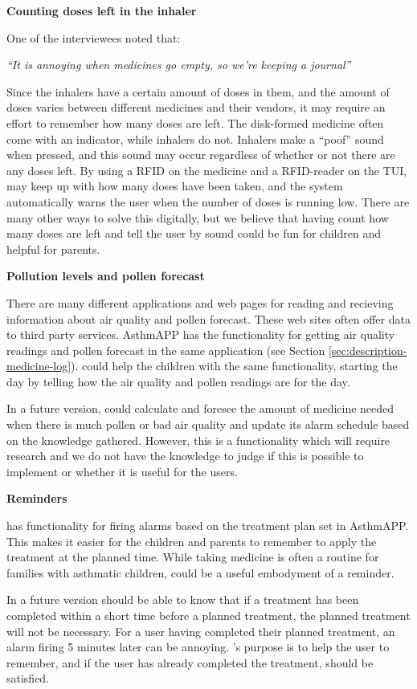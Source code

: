 \textbf{Counting doses left in the inhaler}

One of the interviewees noted that: 

\textit{``It is annoying when medicines go empty, so we're keeping a journal''}

Since the inhalers have a certain amount of doses in them, and the amount of doses varies between different medicines and their vendors, it may require an effort to remember how many doses are left. The disk-formed medicine often come with an indicator, while inhalers do not. Inhalers make a ``poof'' sound when pressed, and this sound may occur regardless of whether or not there are any doses left. By using a RFID on the medicine and a RFID-reader on the TUI, may keep up with how many doses have been taken, and the system automatically warns the user when the number of doses is running low. There are many other ways to solve this digitally, but we believe that having \buddy{} count how many doses are left and  tell the user by sound could be fun for children and helpful for parents.


\textbf{Pollution levels and pollen forecast}

There are many different applications and web pages for reading and recieving information about air quality and pollen forecast. These web sites often offer data to third party services. AsthmAPP has the functionality for getting air quality readings and pollen forecast in the same application (see Section \ref{sec:description-medicine-log}).
\buddy{} could help the children with the same functionality, starting the day by telling how the air quality and pollen readings are for the day. 

In a future version, \buddy{} could calculate and foresee the amount of medicine needed when there is much pollen or bad air quality and update its alarm schedule based on the knowledge gathered. However, this is a functionality which will require research and we do not have the knowledge to judge if this is possible to implement or whether it is useful for the users. 


\textbf{Reminders}

\buddy{} has functionality for firing alarms based on the treatment plan set in AsthmAPP. This makes it easier for the children and parents to remember to apply the treatment at the planned time. While taking medicine is often a routine for families with asthmatic children, \buddy{} could be a useful embodyment of a reminder. 

In a future version \buddy{} should be able to know that if a treatment has been completed within a short time before a planned treatment, the planned treatment will not be necessary. For a user having completed their planned treatment, an alarm firing 5 minutes later can be annoying. \buddy{}'s purpose is to help the user to remember, and if the user has already completed the treatment, \ab{} should be satisfied. 


